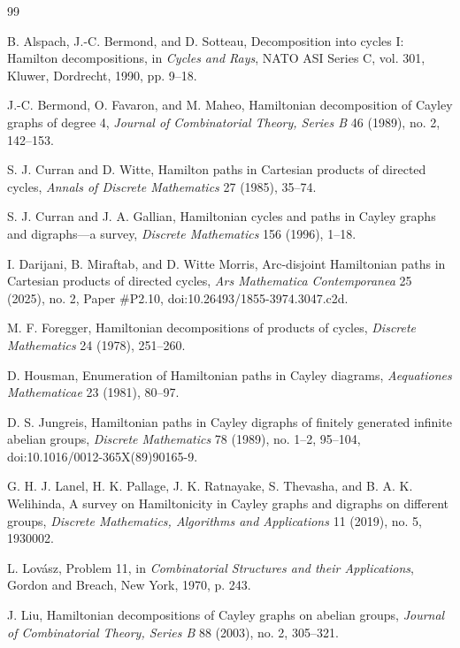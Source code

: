 \documentclass[11pt]{article}
\begin{document}
\begin{thebibliography}{99}


B. Alspach, J.-C. Bermond, and D. Sotteau,
Decomposition into cycles I: Hamilton decompositions,
in \emph{Cycles and Rays}, NATO ASI Series C, vol. 301, Kluwer, Dordrecht, 1990, pp. 9--18.

J.-C. Bermond, O. Favaron, and M. Maheo,
Hamiltonian decomposition of Cayley graphs of degree 4,
\emph{Journal of Combinatorial Theory, Series B} 46 (1989), no. 2, 142--153.

S. J. Curran and D. Witte,
Hamilton paths in Cartesian products of directed cycles,
\emph{Annals of Discrete Mathematics} 27 (1985), 35--74.

S. J. Curran and J. A. Gallian,
Hamiltonian cycles and paths in Cayley graphs and digraphs---a survey,
\emph{Discrete Mathematics} 156 (1996), 1--18.

I. Darijani, B. Miraftab, and D. Witte Morris,
Arc-disjoint Hamiltonian paths in Cartesian products of directed cycles,
\emph{Ars Mathematica Contemporanea} 25 (2025), no. 2, Paper \#P2.10, doi:10.26493/1855-3974.3047.c2d.

M. F. Foregger,
Hamiltonian decompositions of products of cycles,
\emph{Discrete Mathematics} 24 (1978), 251--260.

D. Housman,
Enumeration of Hamiltonian paths in Cayley diagrams,
\emph{Aequationes Mathematicae} 23 (1981), 80--97.

D. S. Jungreis,
Hamiltonian paths in Cayley digraphs of finitely generated infinite abelian groups,
\emph{Discrete Mathematics} 78 (1989), no. 1--2, 95--104, doi:10.1016/0012-365X(89)90165-9.

G. H. J. Lanel, H. K. Pallage, J. K. Ratnayake, S. Thevasha, and B. A. K. Welihinda,
A survey on Hamiltonicity in Cayley graphs and digraphs on different groups,
\emph{Discrete Mathematics, Algorithms and Applications} 11 (2019), no. 5, 1930002.

L. Lov\'asz,
Problem 11,
in \emph{Combinatorial Structures and their Applications}, Gordon and Breach, New York, 1970, p. 243.

J. Liu,
Hamiltonian decompositions of Cayley graphs on abelian groups,
\emph{Journal of Combinatorial Theory, Series B} 88 (2003), no. 2, 305--321.


\end{thebibliography}
\end{document}
